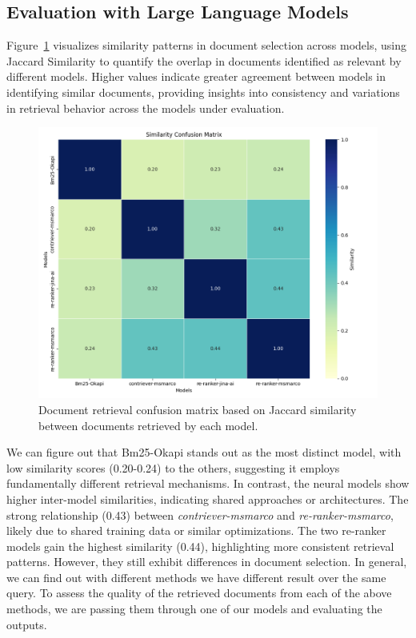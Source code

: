 \subsection{Evaluation with Large Language Models}\label{subsec:evaluation-with-large-language-models}
Figure~\ref{fig:document_retrieval_confusion_matrix} visualizes similarity patterns in document selection across models, using Jaccard Similarity to quantify the overlap in documents identified as relevant by different models.
Higher values indicate greater agreement between models in identifying similar documents, providing insights into consistency and variations in retrieval behavior across the models under evaluation.
\begin{figure}[ht!]
    \centering
    \begin{minipage}[b]{0.45\textwidth}
        \centering
        \includegraphics[width=\textwidth]{res/ret_result_sim_1}
    \end{minipage}
    \caption{Document retrieval confusion matrix based on Jaccard similarity between documents retrieved by each model.}
    \label{fig:document_retrieval_confusion_matrix}
\end{figure}
We can figure out that Bm25-Okapi stands out as the most distinct model, with low similarity scores (0.20-0.24) to the others, suggesting it employs fundamentally different retrieval mechanisms.
In contrast, the neural models show higher inter-model similarities, indicating shared approaches or architectures.
The strong relationship (0.43) between \textit{contriever-msmarco} and \textit{re-ranker-msmarco}, likely due to shared training data or similar optimizations.
The two re-ranker models gain the highest similarity (0.44), highlighting more consistent retrieval patterns.
However, they still exhibit differences in document selection.
In general, we can find out with different methods we have different result over the same query.
To assess the quality of the retrieved documents from each of the above methods, we are passing them through one of our models and evaluating the outputs.

